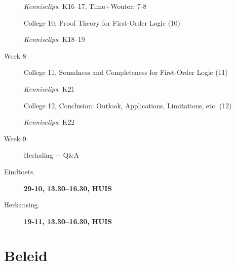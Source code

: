 \begin{description}
    \emph{Kennisclips}: K16--17, Timo+Wouter: 7-8

  \item[\phantom{Week 6}]
    College 10, Proof Theory for First-Order Logic (10)

    \emph{Kennisclips}: K18--19

  \item[Week 8]
    College 11, Soundness and Completeness for First-Order Logic (11)

    \emph{Kennisclips}: K21

  \item[\phantom{Week 6}]
    College 12, Conclusion: Outlook, Applications, Limitations, etc. (12)

    \emph{Kennisclips}: K22

  \item[Week 9.]
    Herhaling + Q\&A

  \item[Eindtoets.]
    {\bf 29-10, 13.30--16.30, HUIS}

  \item[Herkansing.]
    {\bf 19-11, 13.30--16.30, HUIS}

\end{description}

\section*{Beleid}

